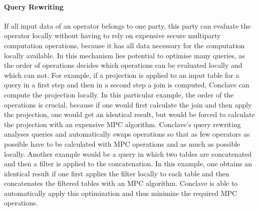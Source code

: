 \paragraph{Query Rewriting}
If all input data of an operator belongs to one party, this party can evaluate the operator locally without having to rely on expensive secure multiparty computation operations, because it has all data necessary for the computation locally available. In this mechanism lies potential to optimise many queries, as the order of operations decides which operations can be evaluated locally and which can not. 
For example, if a projection is applied to an input table for a query in a first step and then in a second step a join is computed, Conclave can compute the projection locally. In this particular example, the order of the operations is crucial, because if one would first calculate the join and then apply the projection, one would get an identical result, but would be forced to calculate the projection with an expensive MPC algorithm. Conclave's query rewriting analyses queries and automatically swaps operations so that as few operators as possible have to be calculated with MPC operations and as much as possible locally. Another example would be a query in which two tables are concatenated and then a filter is applied to the concatenation. In this example, one obtains an identical result if one first applies the filter locally to each table and then concatenates the filtered tables with an MPC algorithm. Conclave is able to automatically apply this optimization and thus minimize the required MPC operations.
\label{Trust_label}	
